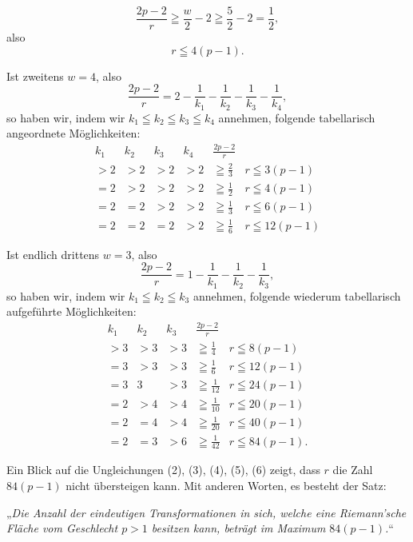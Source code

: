 \documentclass{article}
\begin{document}
\[
\frac{2p - 2}{r} \geqq \frac{w}{2} - 2 \geqq \frac{5}{2} - 2 = \frac{1}{2},
\]
also
\[
r \leqq 4(p - 1).
\tag{4}
\]

Ist zweitens $w = 4$, also
\[
\frac{2p - 2}{r} = 2 - \frac{1}{k_1} - \frac{1}{k_2} - \frac{1}{k_3} - \frac{1}{k_4},
\]
so haben wir, indem wir $k_1 \leqq k_2 \leqq k_3 \leqq k_4$ annehmen, folgende tabellarisch angeordnete Möglichkeiten:
\[
\begin{array}{c|c|c|c|c|c}
\hline\hline
k_1 & k_2 & k_3 & k_4 & \frac{2p - 2}{r} & \\
\hline
> 2 & > 2 & > 2 & > 2 & \geqq \frac{2}{3} & r \leqq 3(p - 1) \\
\hline
= 2 & > 2 & > 2 & > 2 & \geqq \frac{1}{2} & r \leqq 4(p - 1) \\
\hline
= 2 & = 2 & > 2 & > 2 & \geqq \frac{1}{3} & r \leqq 6(p - 1) \\
\hline
= 2 & = 2 & = 2 & > 2 & \geqq \frac{1}{6} & r \leqq 12(p - 1)
\end{array}
\tag{5}
\]

Ist endlich drittens $w = 3$, also
\[
\frac{2p - 2}{r} = 1 - \frac{1}{k_1} - \frac{1}{k_2} - \frac{1}{k_3},
\]
so haben wir, indem wir $k_1 \leqq k_2 \leqq k_3$ annehmen, folgende wiederum tabellarisch aufgeführte Möglichkeiten:
\[
\begin{array}{c|c|c|c|c}
\hline\hline
k_1 & k_2 & k_3 & \frac{2p - 2}{r} & \\
\hline
> 3 & > 3 & > 3 & \geqq \frac{1}{4} & r \leqq 8(p - 1) \\
\hline
= 3 & > 3 & > 3 & \geqq \frac{1}{6} & r \leqq 12(p - 1) \\
\hline
= 3 & 3 & > 3 & \geqq \frac{1}{12} & r \leqq 24(p - 1) \\
\hline
= 2 & > 4 & > 4 & \geqq \frac{1}{10} & r \leqq 20(p - 1) \\
\hline
= 2 & = 4 & > 4 & \geqq \frac{1}{20} & r \leqq 40(p - 1) \\
\hline
= 2 & = 3 & > 6 & \geqq \frac{1}{42} & r \leqq 84(p - 1).
\end{array}
\tag{6}
\]

Ein Blick auf die Ungleichungen (2), (3), (4), (5), (6) zeigt, dass $r$ die Zahl $84(p - 1)$ nicht übersteigen kann. Mit anderen Worten, es besteht der Satz:

„\emph{Die Anzahl der eindeutigen Transformationen in sich, welche eine Riemann'sche Fläche vom Geschlecht $p > 1$ besitzen kann, beträgt im Maximum $84(p - 1)$.}“
\end{document}
